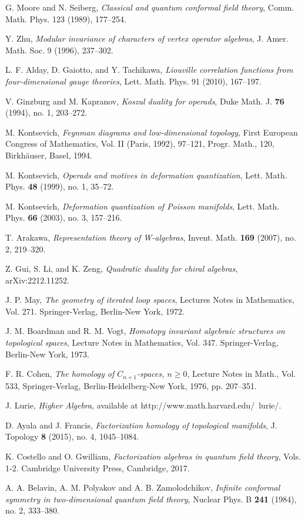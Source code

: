 \begin{thebibliography}{99}
 G. Moore and N. Seiberg, \emph{Classical and quantum conformal field theory}, 
  Comm. Math. Phys. 123 (1989), 177--254.

 Y. Zhu, \emph{Modular invariance of characters of vertex operator algebras}, 
  J. Amer. Math. Soc. 9 (1996), 237--302.

 L. F. Alday, D. Gaiotto, and Y. Tachikawa, \emph{Liouville correlation functions from four-dimensional gauge theories}, 
  Lett. Math. Phys. 91 (2010), 167--197.

 V. Ginzburg and M. Kapranov, \emph{Koszul duality for operads}, Duke Math. J. \textbf{76} (1994), no. 1, 203--272.

 M. Kontsevich, \emph{Feynman diagrams and low-dimensional topology}, First European Congress of Mathematics, Vol. II (Paris, 1992), 97--121, Progr. Math., 120, Birkhäuser, Basel, 1994.

 M. Kontsevich, \emph{Operads and motives in deformation quantization}, Lett. Math. Phys. \textbf{48} (1999), no. 1, 35--72.

 M. Kontsevich, \emph{Deformation quantization of Poisson manifolds}, Lett. Math. Phys. \textbf{66} (2003), no. 3, 157--216.

 T. Arakawa, \emph{Representation theory of W-algebras}, Invent. Math. \textbf{169} (2007), no. 2, 219--320.

 Z. Gui, S. Li, and K. Zeng, \emph{Quadratic duality for chiral algebras}, arXiv:2212.11252.

 J. P. May, \emph{The geometry of iterated loop spaces}, Lectures Notes in Mathematics, Vol. 271. Springer-Verlag, Berlin-New York, 1972.

 J. M. Boardman and R. M. Vogt, \emph{Homotopy invariant algebraic structures on topological spaces}, Lecture Notes in Mathematics, Vol. 347. Springer-Verlag, Berlin-New York, 1973.

 F. R. Cohen, \emph{The homology of $C_{n+1}$-spaces, $n \geq 0$}, Lecture Notes in Math., Vol. 533, Springer-Verlag, Berlin-Heidelberg-New York, 1976, pp. 207--351.

 J. Lurie, \emph{Higher Algebra}, available at http://www.math.harvard.edu/~lurie/.

 D. Ayala and J. Francis, \emph{Factorization homology of topological manifolds}, J. Topology \textbf{8} (2015), no. 4, 1045--1084.

 K. Costello and O. Gwilliam, \emph{Factorization algebras in quantum field theory}, Vols. 1-2. Cambridge University Press, Cambridge, 2017.

 A. A. Belavin, A. M. Polyakov and A. B. Zamolodchikov, \emph{Infinite conformal symmetry in two-dimensional quantum field theory}, Nuclear Phys. B \textbf{241} (1984), no. 2, 333--380.
 
\end{thebibliography}
